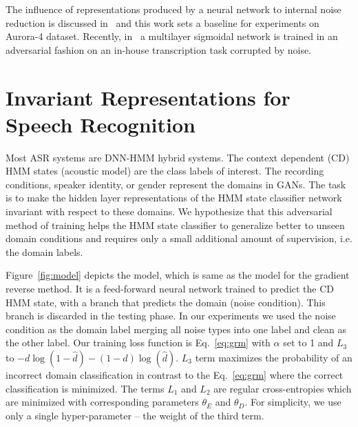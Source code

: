 \documentclass{article}
\begin{document}

The influence of representations produced by a neural network to internal noise reduction is discussed in~\cite{yu2013feature} and this work sets a baseline for experiments on  Aurora-4 dataset. Recently, in~\cite{yusuke2016adversarial} a multilayer sigmoidal network is trained in an adversarial fashion on an in-house transcription task corrupted by noise.
\section{Invariant Representations for Speech Recognition}
\label{sec:invariant-speech}

Most ASR systems are DNN-HMM hybrid systems. The context dependent (CD) HMM states (acoustic model) are the class labels of interest. The
recording conditions, speaker identity, or gender represent the domains in GANs. The task is to make the hidden layer representations of the HMM state classifier network 
invariant with respect to these domains. We hypothesize that this adversarial method of
training helps the HMM state classifier to generalize better to unseen domain conditions and requires only a  
small additional amount of supervision, i.e. the domain labels.  

Figure~\ref{fig:model} depicts the model, which is same as the model for the gradient reverse method. It is a feed-forward neural network trained to predict the CD HMM state, with a branch that predicts the domain (noise condition). This branch is discarded in the testing phase. In our experiments we
used the noise condition as the domain label merging all noise types into one label
and clean as the other label. Our training loss function is  Eq.~\ref{eq:grm} with $\alpha$ set to 1 and
$L_3$ to $-d\log(1 - \hat{d}) - (1-d)\log(\hat{d})$. $L_3$ term maximizes the probability
of an incorrect domain classification in contrast to the Eq.~\ref{eq:grm} where the 
correct classification is minimized.
The terms $L_1$ and $L_2$ are 
regular cross-entropies which are minimized with corresponding parameters $\theta_E$ and $\theta_D$.
For simplicity, we use only a single hyper-parameter -- the weight of the third term.
 
\end{document}
